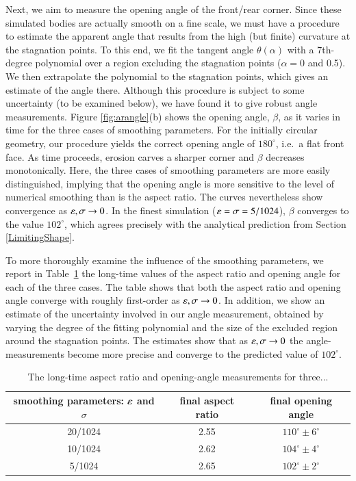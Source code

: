 \documentclass[preprint, 10pt]{elsarticle}
\begin{document}
	Next, we aim to measure the opening angle of the front/rear corner. Since these simulated bodies are actually smooth on a fine scale, we must have a procedure to estimate the apparent angle that results from the high (but finite) curvature at the stagnation points. To this end, we fit the tangent angle $\theta(\alpha)$ with a 7th-degree polynomial over a region excluding the stagnation points ($\alpha = 0$ and 0.5). We then extrapolate the polynomial to the stagnation points, which gives an estimate of the angle there. Although this procedure is subject to some uncertainty (to be examined below), we have found it to give robust angle measurements. Figure \ref{fig:arangle}(b) shows the opening angle, $\beta$, as it varies in time for the three cases of smoothing parameters. For the initially circular geometry, our procedure yields the correct opening angle of $180^{\circ}$, i.e.~a flat front face. As time proceeds, erosion carves a sharper corner and $\beta$ decreases monotonically. Here, the three cases of smoothing parameters are more easily distinguished, implying that the opening angle is more sensitive to the level of numerical smoothing than is the aspect ratio. The curves nevertheless show convergence as $\varepsilon, \sigma \to 0$. In the finest simulation ($\varepsilon = \sigma = 5/1024$), $\beta$ converges to the value $102^{\circ}$, which agrees precisely with the analytical prediction from Section \ref{LimitingShape}. 

	To more thoroughly examine the influence of the smoothing parameters, we report in Table~\ref{table:arangle} the long-time values of the aspect ratio and opening angle for each of the three cases. The table shows that both the aspect ratio and opening angle converge with roughly first-order as $\varepsilon, \sigma \to 0$. In addition, we show an estimate of the uncertainty involved in our angle measurement, obtained by varying the degree of the fitting polynomial and the size of the excluded region around the stagnation points. The estimates show that as $\varepsilon, \sigma \to 0$ the angle-measurements become more precise and converge to the predicted value of $102^{\circ}$.

\begin{table}%
\begin{center}
\caption{The long-time aspect ratio and opening-angle measurements for three...
} 
\vspace{0.3 pc}
\label{table:arangle}
\begin{tabular}{c c c}
\hline
\hspace{0.5pc} smoothing parameters: $\varepsilon$ and $\sigma$
\hspace{0.5pc} & final aspect ratio 
\hspace{0.5pc} & final opening angle \\
\hline
20/1024		& 2.55	& $110^\circ \pm 6^\circ$	\\
10/1024		& 2.62	& $104^\circ \pm 4^\circ$	\\
5/1024		& 2.65	& $102^\circ \pm 2^\circ$	\\
\hline
\end{tabular}
\end{center}
\end{table}
\end{document}
